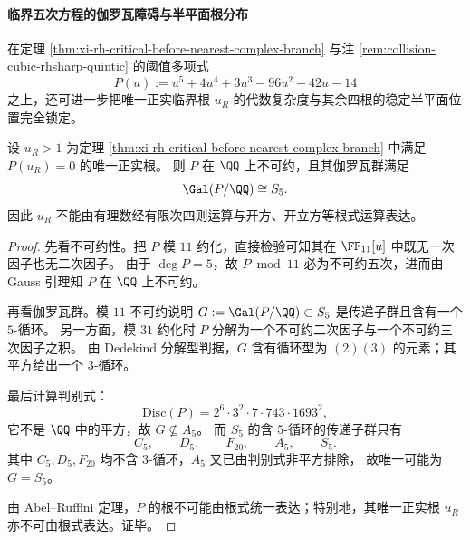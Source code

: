 \paragraph{临界五次方程的伽罗瓦障碍与半平面根分布}
在定理 \ref{thm:xi-rh-critical-before-nearest-complex-branch} 与注 \ref{rem:collision-cubic-rhsharp-quintic} 的阈值多项式
\[
P(u):=u^5+4u^4+3u^3-96u^2-42u-14
\]
之上，还可进一步把唯一正实临界根 \(u_R\) 的代数复杂度与其余四根的稳定半平面位置完全锁定。

\begin{proposition}\label{prop:xi-collision-threshold-quintic-unsolvability}
设 \(u_R>1\) 为定理 \ref{thm:xi-rh-critical-before-nearest-complex-branch} 中满足 \(P(u_R)=0\) 的唯一正实根。
则 \(P\) 在 \(\QQ\) 上不可约，且其伽罗瓦群满足
\[
\Gal(P/\QQ)\cong S_5.
\]
因此 \(u_R\) 不能由有理数经有限次四则运算与开方、开立方等根式运算表达。
\end{proposition}
\begin{proof}
先看不可约性。把 \(P\) 模 \(11\) 约化，直接检验可知其在 \(\FF_{11}[u]\) 中既无一次因子也无二次因子。
由于 \(\deg P=5\)，故 \(P\bmod 11\) 必为不可约五次，进而由 Gauss 引理知 \(P\) 在 \(\QQ\) 上不可约。

再看伽罗瓦群。模 \(11\) 不可约说明
\(
G:=\Gal(P/\QQ)\subset S_5
\)
是传递子群且含有一个 \(5\)-循环。
另一方面，模 \(31\) 约化时 \(P\) 分解为一个不可约二次因子与一个不可约三次因子之积。
由 Dedekind 分解型判据，\(G\) 含有循环型为 \((2)(3)\) 的元素；其平方给出一个 \(3\)-循环。

最后计算判别式：
\[
\mathrm{Disc}(P)=2^6\cdot 3^2\cdot 7\cdot 743\cdot 1693^2,
\]
它不是 \(\QQ\) 中的平方，故 \(G\nsubseteq A_5\)。
而 \(S_5\) 的含 \(5\)-循环的传递子群只有
\[
C_5,\qquad D_5,\qquad F_{20},\qquad A_5,\qquad S_5.
\]
其中 \(C_5,D_5,F_{20}\) 均不含 \(3\)-循环，\(A_5\) 又已由判别式非平方排除，
故唯一可能为 \(G=S_5\)。

由 Abel--Ruffini 定理，\(P\) 的根不可能由根式统一表达；特别地，其唯一正实根 \(u_R\) 亦不可由根式表达。证毕。
\end{proof}

